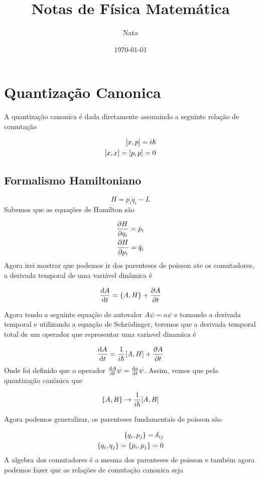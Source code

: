 \documentclass{book}
\title{Notas de Física Matemática}
\author{Nata}
\date{\today}
\begin{document}
	\maketitle
	\chapter{Quantização Canonica}
	A quantização canonica é dada diretamente assumindo a seguinte relação de comutação	
	
	\begin{eqnarray}
		\comm{x}{p}=i\hbar \\
		\comm{x}{x}=\comm{p}{p}=0		
	\end{eqnarray}
	\section{Formalismo Hamiltoniano}
	\begin{equation}
		H=p_i \dot{q}_i-L
	\end{equation}
	Sabemos que as equações de Hamilton são
	
	\begin{eqnarray}
		\pdv{H}{q_i}=\dot{p}_i \\
		\pdv{H}{p_i}=\dot{q}_i
	\end{eqnarray}
	Agora irei mostrar que podemos ir dos parenteses de poisson ate os comutadores, a derivada temporal de uma variável dinâmica é
	
	\begin{equation}
		\dv{A}{t}= \qty{A,H}+\pdv{A}{t}
	\end{equation}

	Agora tendo a seguinte equação de autovalor $A \psi =a \psi$ e tomando a derivada temporal e utilizando a equação de Schrödinger, teremos que a derivada temporal total de um operador que representar uma variavel dinamica é
	
	\begin{equation}
		\dv{A}{t}= \frac{1}{i\hbar} \comm{A}{H}+ \pdv{A}{t}
	\end{equation}
	Onde foi definido que o operador $\dv{A}{t} \psi=\dv{a}{t}\psi$. Assim, vemos que pela quantização canônica que 
	
	\begin{equation}
		\qty{A,B} \to \frac{1}{i\hbar} \comm{A}{B}
	\end{equation} 
	
	Agora podemos generalizar, os parenteses fundamentais de poisson são
	
	
	\begin{align}
		\qty{q_i,p_j}= \delta_{ij}\\
		\qty{q_i,q_j}=\qty{p_i,p_j}=0
	\end{align}
	A algebra dos comutadores é a mesma dos parenteses de poisson e também agora podemos fazer que as relações de comutação canonica seja
	
\end{document}
